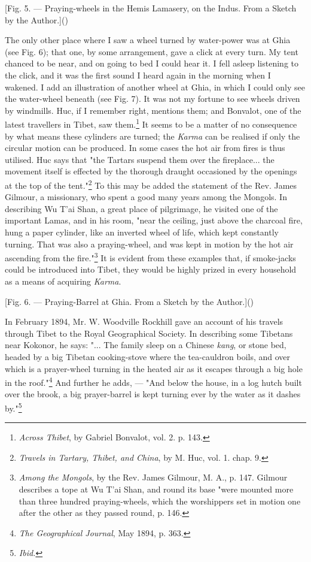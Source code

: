 \documentclass[a4paper, 11pt, oneside, polutonikogreek, english]{article}
\begin{document}
[Fig. 5. --- Praying-wheels in the Hemis Lamasery, on the Indus. From a Sketch by the Author.]()

The only other place where I saw a wheel turned by water-power was at Ghia (see Fig. 6); that one, by some arrangement, gave a click at every turn. My tent chanced to be near, and on going to bed I could hear it. I fell asleep listening to the click, and it was the first sound I heard again in the morning when I wakened. I add an illustration of another wheel at Ghia, in which I could only see the water-wheel beneath (see Fig. 7). It was not my fortune to see wheels driven by windmills. Huc, if I remember right, mentions them; and Bonvalot, one of the latest travellers in Tibet, saw them.\footnote{\emph{Across Thibet}, by Gabriel Bonvalot, vol. 2. p. 143.} It seems to be a matter of no consequence by what means these cylinders are turned; the \emph{Karma} can be realised if only the circular motion can be produced. In some cases the hot air from fires is thus utilised. Huc says that "the Tartars suspend them over the fireplace... the movement itself is effected by the thorough draught occasioned by the openings at the top of the tent."\footnote{\emph{Travels in Tartary, Thibet, and China}, by M. Huc, vol. 1. chap. 9.} To this may be added the statement of the Rev. James Gilmour, a missionary, who spent a good many years among the Mongols. In describing Wu T'ai Shan, a great place of pilgrimage, he visited one of the important Lamas, and in his room, "near the ceiling, just above the charcoal fire, hung a paper cylinder, like an inverted wheel of life, which kept constantly turning. That was also a praying-wheel, and was kept in motion by the hot air ascending from the fire."\footnote{\emph{Among the Mongols}, by the Rev. James Gilmour, M. A., p. 147. Gilmour describes a tope at Wu T'ai Shan, and round its base "were mounted more than three hundred praying-wheels, which the worshippers set in motion one after the other as they passed round, p. 146.} It is evident from these examples that, if smoke-jacks could be introduced into Tibet, they would be highly prized in every household as a means of acquiring \emph{Karma}.

[Fig. 6. --- Praying-Barrel at Ghia. From a Sketch by the Author.]()

In February 1894, Mr. W. Woodville Rockhill gave an account of his travels through Tibet to the Royal Geographical Society. In describing some Tibetans near Kokonor, he says: "... The family sleep on a Chinese \emph{kang}, or stone bed, headed by a big Tibetan cooking-stove where the tea-cauldron boils, and over which is a prayer-wheel turning in the heated air as it escapes through a big hole in the roof."\footnote{\emph{The Geographical Journal}, May 1894, p. 363.} And further he adds, --- "And below the house, in a log hutch built over the brook, a big prayer-barrel is kept turning ever by the water as it dashes by."\footnote{\emph{Ibid.}}
\end{document}

